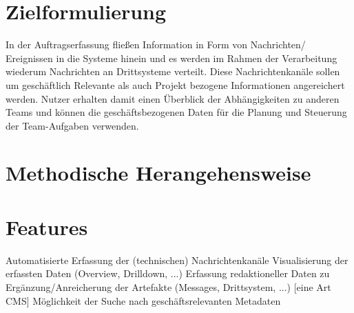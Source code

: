 \documentclass[12pt,reqno]{amsart}
\begin{document}
\bigskip



\section*{Zielformulierung}
In der Auftragserfassung fließen Information in Form von Nachrichten/ Ereignissen in die Systeme hinein und es werden im Rahmen der Verarbeitung wiederum Nachrichten an Drittsysteme verteilt. Diese Nachrichtenkanäle sollen um geschäftlich Relevante als auch Projekt bezogene Informationen angereichert werden. Nutzer erhalten damit einen Überblick der Abhängigkeiten zu anderen Teams und können die geschäftsbezogenen Daten für die Planung und Steuerung der Team-Aufgaben verwenden.
\bigskip
\textbf{}

\bigskip


\bigskip

\section*{ Methodische Herangehensweise}


\bigskip

\section*{ Features}
Automatisierte Erfassung der (technischen) Nachrichtenkanäle
Visualisierung der erfassten Daten (Overview, Drilldown, ...)
Erfassung redaktioneller Daten zu Ergänzung/Anreicherung der Artefakte (Messages, Drittsystem, ...) [eine Art CMS]
Möglichkeit der Suche nach geschäftsrelevanten Metadaten


\bigskip

\medskip
\end{document}
